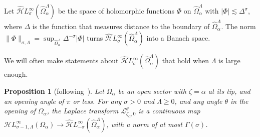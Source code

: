 \documentclass{article}
\newcommand{\singexp}[2]{\mathcal{H}L^\infty_{#1, #2}}
\newcommand{\dualsingexp}[1]{\widehat{\mathcal{H}}L^\infty_{#1}}
\newcommand{\laplace}{\mathcal{L}}
\theoremstyle{definition}
\theoremstyle{plain}
\newtheorem{prop}[definition]{Proposition}
\newenvironment{todo}{\color{Coral}}{\color{black}}
\begin{document}
Let $\dualsingexp{\sigma}(\widehat{\Omega}_\alpha^\Lambda)$ be the space of holomorphic functions $\Phi$ on $\widehat{\Omega}_\alpha^\Lambda$ with $|\Phi| \lesssim \Delta^\sigma$, where $\Delta$ is the function that measures distance to the boundary of $\widehat{\Omega}_\alpha^\Lambda$. The norm $\|\Phi\|_{\sigma, \Lambda} = \sup_{\widehat{\Omega}_\alpha^\Lambda} \Delta^{-\sigma} |\Phi|$ turns $\dualsingexp{\sigma}(\widehat{\Omega}_\alpha^\Lambda)$ into a Banach space.

We will often make statements about $\dualsingexp{\sigma}(\widehat{\Omega}_\alpha^\Lambda)$ that hold when $\Lambda$ is large enough.
\begin{todo}\par
[Cite \cite{sternin1995borel} better for the theorem. Note that these results don't depend on which cotangent fiber we're mapping into. $\widehat{\Omega}$ is defined across all cotangent fibers over ordinary points.]
\end{todo}
%
\begin{prop}[following~\cite{sternin1995borel}]\label{prop:laplace-cont}
Let $\Omega_\alpha$ be an open sector with $\zeta = \alpha$ at its tip, and an opening angle of $\pi$ or less. For any $\sigma > 0$ and $\Lambda \ge 0$, and any angle $\theta$ in the opening of $\Omega_\alpha$, the Laplace transform $\laplace_{\zeta_\alpha, 0}^\theta$ is a continuous map $\singexp{\sigma-1}{\Lambda}(\Omega_\alpha) \to \dualsingexp{-\sigma}(\widehat{\Omega}_\alpha^\Lambda)$, with a norm of at most $\Gamma(\sigma)$.
\end{prop}
\end{document}
